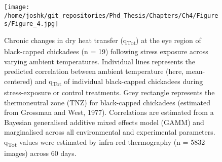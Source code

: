 \documentclass[12pt]{article}
\begin{document}

\begin{figure}[ht]
	\centering
    \captionsetup{width=0.85\linewidth}
	\texttt{[image: /home/joshk/git\_repositories/Phd\_Thesis/Chapters/Ch4/Figures/Figure\_4.jpg]}
    \caption[\hspace{0.5cm}Chronic changes in dry heat transfer (q\textsubscript{Tot}) at the eye region of black-capped chickadees (n = 19) following stress exposure across varying ambient temperatures.]{Chronic changes in dry heat transfer (q\textsubscript{Tot}) at the eye region of black-capped chickadees (n = 19) following stress exposure across varying ambient temperatures. Individual lines represents the predicted correlation between ambient temperature (here, mean-centered) and q\textsubscript{Tot} of individual black-capped chickadees during stress-exposure or control treatments. Grey rectangle represents the thermoneutral zone (TNZ) for black-capped chickadees (estimated from Grossman and West, 1977). Correlations are estimated from a Bayesian generalised additive mixed effects model (GAMM) and marginalised across all environmental and experimental parameters. q\textsubscript{Tot} values were estimated by infra-red thermography (n = 5832 images) across 60 days. 
}
\label{Fig4.4}
\end{figure}
\clearpage 
\end{document}
